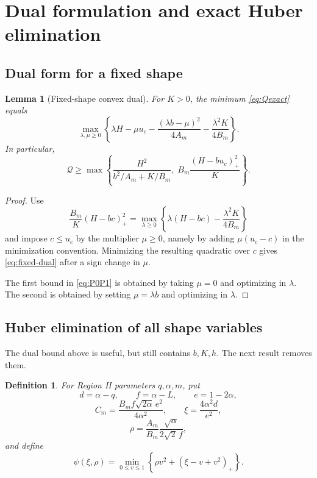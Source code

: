 \documentclass[11pt]{article}
\newtheorem{lemma}[theorem]{Lemma}
\newtheorem{definition}[theorem]{Definition}
\newcommand{\cQ}{\mathcal Q}
\newcommand{\pos}[1]{\left(#1\right)_{+}}
\begin{document}
\section{Dual formulation and exact Huber elimination}

\subsection{Dual form for a fixed shape}

\begin{lemma}[Fixed-shape convex dual]\label{lem:fixed-dual}
For $K>0$, the minimum \eqref{eq:Qexact} equals
\begin{equation}\label{eq:fixed-dual}
        \max_{\lambda,\mu\ge0}
        \left\{
        \lambda H-\mu u_c
        -\frac{(\lambda b-\mu)^2}{4A_m}
        -\frac{\lambda^2K}{4B_m}
        \right\}.
\end{equation}
In particular,
\begin{equation}\label{eq:P0P1}
        \cQ\ge
        \max\left\{
        \frac{H^2}{b^2/A_m+K/B_m},
        \;B_m\frac{\pos{H-bu_c}^2}{K}
        \right\}.
\end{equation}
\end{lemma}

\begin{proof}
Use
\[
        \frac{B_m}{K}\pos{H-bc}^2
        =\max_{\lambda\ge0}
        \left\{\lambda(H-bc)-\frac{\lambda^2K}{4B_m}\right\}
\]
and impose $c\le u_c$ by the multiplier $\mu\ge0$, namely by adding
$\mu(u_c-c)$ in the minimization convention.  Minimizing the resulting
quadratic over $c$ gives \eqref{eq:fixed-dual} after a sign change in
$\mu$.

The first bound in \eqref{eq:P0P1} is obtained by taking $\mu=0$ and
optimizing in $\lambda$.  The second is obtained by setting
$\mu=\lambda b$ and optimizing in $\lambda$.
\end{proof}

\subsection{Huber elimination of all shape variables}

The dual bound above is useful, but still contains $b,K,h$.  The next
result removes them.

\begin{definition}\label{def:huber-params}
For Region II parameters $q,\alpha,m$, put
\[
        d=\alpha-q,
        \qquad f=\alpha-L,
        \qquad e=1-2\alpha,
\]
\begin{equation}\label{eq:C-xi-rho}
        C_m=\frac{B_m f\sqrt{2\alpha}\,e^2}{4\alpha^2},
        \qquad
        \xi=\frac{4\alpha^2 d}{e^2},
\end{equation}
\begin{equation}\label{eq:rho-def}
        \rho=\frac{A_m}{B_m}\frac{\sqrt\alpha}{2\sqrt2\,f},
\end{equation}
and define
\begin{equation}\label{eq:psi-def}
        \psi(\xi,\rho)=
        \min_{0\le v\le1}
        \left\{
        \rho v^2+\pos{\xi-v+v^2}
        \right\}.
\end{equation}
\end{definition}
\end{document}
